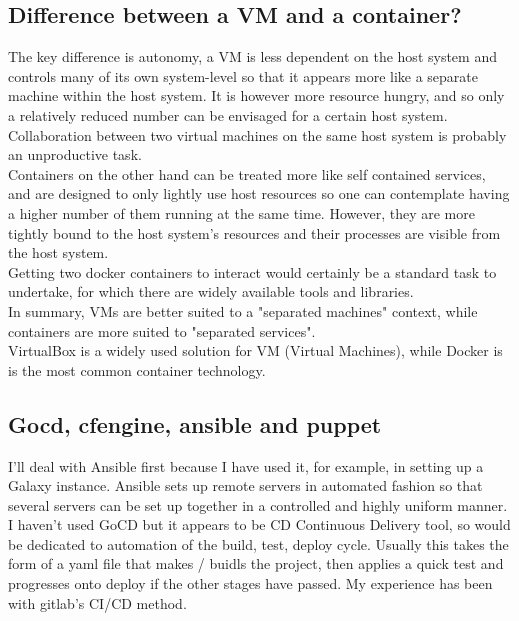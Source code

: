 \documentclass[14pt]{article}
\begin{document}
\subsection*{Difference between a VM and a container?}

The key difference is autonomy, a VM is less dependent on the host system and controls many of its own system-level so that it appears more like a separate machine within the host system. It is however more resource hungry, and so only a relatively reduced number can be envisaged for a certain host system. \\

Collaboration between two virtual machines on the same host system is probably an unproductive task. \\

Containers on the other hand can be treated more like self contained services, and are designed to only lightly use host resources so one can contemplate having a higher number of them running at the same time. However, they are more tightly bound to the host system's resources and their processes are visible from the host system. \\

Getting two docker containers to interact would certainly be a standard task to undertake, for which there are widely available tools and libraries. \\

In summary, VMs are better suited to a "separated machines" context, while containers are more suited to "separated services". \\

VirtualBox is a widely used solution for VM (Virtual Machines), while Docker is is the most common container technology. \\

\subsection*{Gocd, cfengine, ansible and puppet}

I'll deal with Ansible first because I have used it, for example, in setting up a Galaxy instance. Ansible sets up remote servers in automated fashion so that several servers can be set up together in a controlled and highly uniform manner. \\

I haven't used GoCD but it appears to be CD Continuous Delivery tool, so would be dedicated to automation of the build, test, deploy cycle. Usually this takes the form of a yaml file that makes / buidls the project,
then applies a quick test and progresses onto deploy if the other stages have passed. My experience has been with gitlab's CI/CD method. \\
\end{document}
